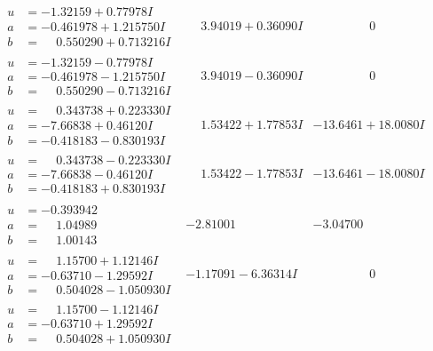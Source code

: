 \documentclass[1p]{elsarticle_modified}
\theoremstyle{definition}
\begin{document}
$$\begin{array}{c|c|c}
\begin{aligned}
u &= -1.32159 + 0.77978 I \\
a &= -0.461978 + 1.215750 I \\
b &= \phantom{-}0.550290 + 0.713216 I\end{aligned}
 & \phantom{-}3.94019 + 0.36090 I & \phantom{-0.000000 } 0 \\ \hline\begin{aligned}
u &= -1.32159 - 0.77978 I \\
a &= -0.461978 - 1.215750 I \\
b &= \phantom{-}0.550290 - 0.713216 I\end{aligned}
 & \phantom{-}3.94019 - 0.36090 I & \phantom{-0.000000 } 0 \\ \hline\begin{aligned}
u &= \phantom{-}0.343738 + 0.223330 I \\
a &= -7.66838 + 0.46120 I \\
b &= -0.418183 - 0.830193 I\end{aligned}
 & \phantom{-}1.53422 + 1.77853 I & -13.6461 + 18.0080 I \\ \hline\begin{aligned}
u &= \phantom{-}0.343738 - 0.223330 I \\
a &= -7.66838 - 0.46120 I \\
b &= -0.418183 + 0.830193 I\end{aligned}
 & \phantom{-}1.53422 - 1.77853 I & -13.6461 - 18.0080 I \\ \hline\begin{aligned}
u &= -0.393942\phantom{ +0.000000I} \\
a &= \phantom{-}1.04989\phantom{ +0.000000I} \\
b &= \phantom{-}1.00143\phantom{ +0.000000I}\end{aligned}
 & -2.81001\phantom{ +0.000000I} & -3.04700\phantom{ +0.000000I} \\ \hline\begin{aligned}
u &= \phantom{-}1.15700 + 1.12146 I \\
a &= -0.63710 - 1.29592 I \\
b &= \phantom{-}0.504028 - 1.050930 I\end{aligned}
 & -1.17091 - 6.36314 I & \phantom{-0.000000 } 0 \\ \hline\begin{aligned}
u &= \phantom{-}1.15700 - 1.12146 I \\
a &= -0.63710 + 1.29592 I \\
b &= \phantom{-}0.504028 + 1.050930 I\end{aligned}

\end{array}$$
\end{document}
